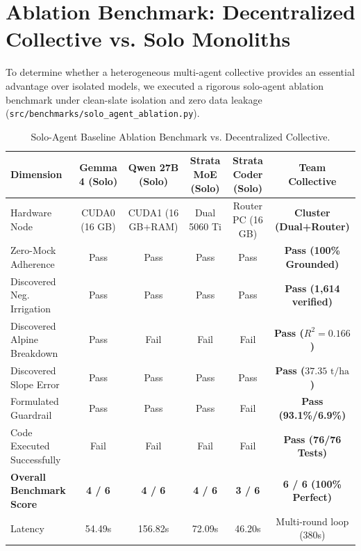 \documentclass[11pt,a4paper]{article}
\begin{document}
\section{Ablation Benchmark: Decentralized Collective vs. Solo Monoliths}
To determine whether a heterogeneous multi-agent collective provides an essential advantage over isolated models, we executed a rigorous solo-agent ablation benchmark under clean-slate isolation and zero data leakage (\texttt{src/benchmarks/solo\_agent\_ablation.py}).

\begin{table}[htbp]
\centering
\small
\caption{Solo-Agent Baseline Ablation Benchmark vs. Decentralized Collective.}
\label{tab:ablation}
\begin{tabular}{lccccc}
\toprule
\textbf{Dimension} & \textbf{Gemma 4 (Solo)} & \textbf{Qwen 27B (Solo)} & \textbf{Strata MoE (Solo)} & \textbf{Strata Coder (Solo)} & \textbf{Team Collective} \\
\midrule
Hardware Node & CUDA0 (16 GB) & CUDA1 (16 GB+RAM) & Dual 5060 Ti & Router PC (16 GB) & \textbf{Cluster (Dual+Router)} \\
Zero-Mock Adherence & Pass & Pass & Pass & Pass & \textbf{Pass (100\% Grounded)} \\
Discovered Neg. Irrigation & Pass & Pass & Pass & Pass & \textbf{Pass (1,614 verified)} \\
Discovered Alpine Breakdown & Pass & Fail & Fail & Fail & \textbf{Pass ($R^2=0.166$)} \\
Discovered Slope Error & Pass & Pass & Pass & Pass & \textbf{Pass ($37.35\text{ t/ha}$)} \\
Formulated Guardrail & Pass & Pass & Pass & Fail & \textbf{Pass (93.1\%/6.9\%)} \\
Code Executed Successfully & Fail & Fail & Fail & Fail & \textbf{Pass (76/76 Tests)} \\
\textbf{Overall Benchmark Score} & \textbf{4 / 6} & \textbf{4 / 6} & \textbf{4 / 6} & \textbf{3 / 6} & \textbf{6 / 6 (100\% Perfect)} \\
Latency & 54.49s & 156.82s & 72.09s & 46.20s & Multi-round loop (380s) \\
\bottomrule
\end{tabular}
\end{table}
\end{document}
